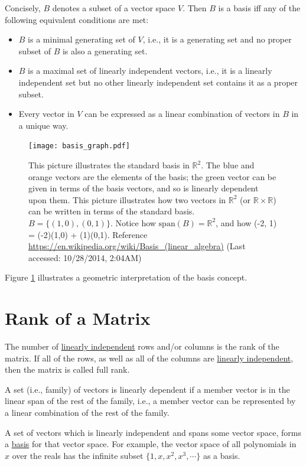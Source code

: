 \documentclass[conference,final,11pt,technote,onecolumn]{IEEEtran}\usepackage[]{graphicx}\usepackage[]{color}
\begin{document}
Concisely, $B$ denotes a subset of a vector space $V$. Then $B$ is a basis iff any of the following equivalent conditions are met:
\begin{itemize}
\item $B$ is a minimal generating set of $V$, i.e., it is a generating set and no proper subset of $B$ is also a generating set.
\item $B$ is a maximal set of linearly independent vectors, i.e., it is a linearly independent set but no other linearly independent set contains it as a proper subset.
\item Every vector in $V$ can be expressed as a linear combination of vectors in $B$ in a unique way. 
\end{itemize}
\begin{figure}[!h]
\centering
\texttt{[image: basis\_graph.pdf]}
\caption{\label{fig:basis}This picture illustrates the standard basis in $\mathbb{R}^2$. The blue and orange vectors are the elements of the basis; the green vector can be given in terms of the basis vectors, and so is linearly dependent upon them. This picture illustrates how two vectors in $\mathbb{R}^2$ (or $\mathbb{R} \times \mathbb{R}$) can be written in terms of the standard basis. $B = \{(1,0), (0,1)\}$. Notice how $\text{span}(B) = \mathbb{R}^2$, and how (-2, 1) = (-2)(1,0) + (1)(0,1). Reference \url{https://en.wikipedia.org/wiki/Basis_(linear_algebra)} (Last accessed: 10/28/2014, 2:04AM)}
\end{figure}

Figure \ref{fig:basis} illustrates a geometric interpretation of the basis concept.
	
	\section{Rank of a Matrix}
	\label{term:rank_of_a_matrix}
The number of \hyperref[term:linearly_independent_vectors]{linearly independent} rows and/or columns is the rank of the matrix. If all of the rows, as well as all of the columns are \hyperref[term:rank_of_a_matrix]{linearly independent}, then the matrix is called full rank.

A set (i.e., family) of vectors is linearly dependent if a member vector is in the linear span of the rest of the family, i.e., a member vector can be represented by a linear combination of the rest of the family. 

A set of vectors which is linearly independent and spans some vector space, forms a \hyperref[term:basis]{basis} for that vector space. For example, the vector space of all polynomials in $x$ over the reals has the infinite subset $\{1, x, x^2, x^3, \cdots\}$ as a basis.
\end{document}
